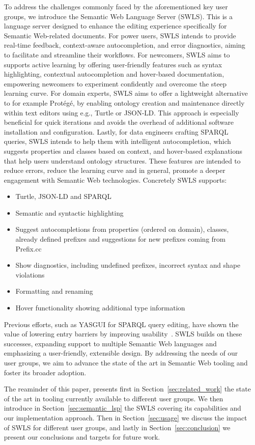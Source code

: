 To address the challenges commonly faced by the aforementioned key user groups, we introduce the Semantic Web Language Server (SWLS).
This is a language server designed to enhance the editing experience specifically for Semantic Web-related documents. 
For power users, SWLS intends to provide real-time feedback, context-aware autocompletion, and error diagnostics, aiming to facilitate and streamline their workflows.
For newcomers, SWLS aims to supports active learning by offering user-friendly features such as syntax highlighting, contextual autocompletion and hover-based documentation, empowering newcomers to experiment confidently and overcome the steep learning curve.
For domain experts, SWLS aims to offer a lightweight alternative to for example Protégé, by enabling ontology creation and maintenance directly within text editors using e.g., Turtle or JSON-LD.
This approach is especially beneficial for quick iterations and avoids the overhead of additional software installation and configuration.
Lastly, for data engineers crafting SPARQL queries, SWLS intends to help them with intelligent autocompletion, which suggests properties and classes based on context, and hover-based explanations that help users understand ontology structures.
These features are intended to reduce errors, reduce the learning curve and in general, promote a deeper engagement with Semantic Web technologies.
Concretely SWLS supports:
\begin{itemize}
  \item Turtle, JSON-LD and SPARQL
  \item Semantic and syntactic highlighting
  \item Suggest autocompletions from properties (ordered on domain), classes, already defined prefixes and suggestions for new prefixes coming from Prefix.cc
  \item Show diagnostics, including undefined prefixes, incorrect syntax and shape violations
  \item Formatting and renaming
  \item Hover functionality showing additional type information
\end{itemize}

Previous efforts, such as YASGUI for SPARQL query editing, have shown the value of lowering entry barriers by improving usability~\cite{10.3233/SW-150197,10.1007/978-3-642-41242-4_7}. 
SWLS builds on these successes, expanding support to multiple Semantic Web languages and emphasizing a user-friendly, extensible design. 
By addressing the needs of our user groups, we aim to advance the state of the art in Semantic Web tooling and foster its broader adoption.

The reaminder of this paper, presents first in Section~\ref{sec:related_work} the state of the art in tooling currently available to different user groups.
We then introduce in Section~\ref{sec:semantic_lsp} the SWLS covering its capabilities and our implementation approach.
Then in Section~\ref{sec:usage} we discuss the impact of SWLS for different user groups,
and lastly in Section~\ref{sec:conclusion} we present our conclusions and targets for future work.

